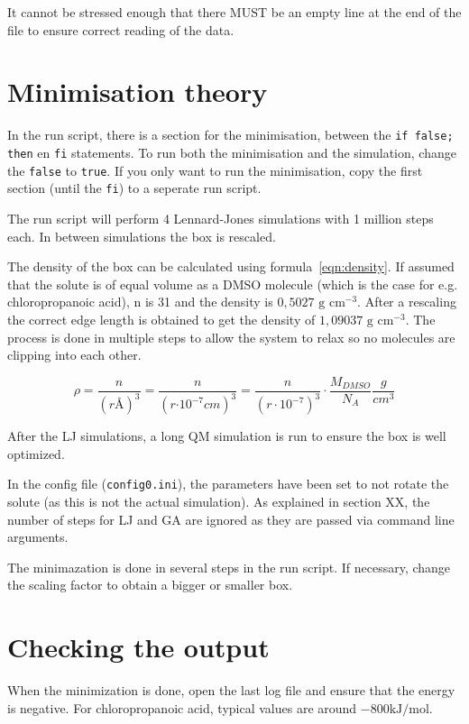 It cannot be stressed enough that there MUST be an empty line at the end of the 
file to ensure correct reading of the data.

\section{Minimisation theory}
In the run script, there is a section for the minimisation, between the 
\verb|if false; then| en \verb|fi| statements. To run both the minimisation and 
the simulation, change the \verb|false| to \verb|true|. If you only want to run 
the minimisation, copy the first section (until the \verb|fi|) to a seperate 
run script.

The run script will perform 4 Lennard-Jones simulations with 1 million steps 
each. In between simulations the box is rescaled.

The density of the box can be calculated using formula~\ref{eqn:density}. If 
assumed that the solute is of equal volume as a DMSO molecule (which is the 
case for e.g. chloropropanoic acid), n is 31 and the density is $0,5027 
\textrm{ g cm}^{-3}$. After a rescaling the correct edge length is obtained to 
get the density of $1,09037 \textrm{ g cm}^{-3}$.\cite{Radhamma2008}
The process is done in multiple steps to allow the system to relax so no 
molecules are clipping into each other.

\begin{equation} \label{eqn:density}
\rho = \dfrac{n}{(r \si{\angstrom})^3} = \dfrac{n}{(r \si{\cdot 10^{-7} cm})^3} 
=
\dfrac{n}{(r \cdot 10^{-7})^3} \cdot \dfrac{M_{DMSO}}{N_A} \dfrac{g}{cm^3}
\end{equation}

After the LJ simulations, a long QM simulation is run to ensure the box is well 
optimized.

In the config file (\verb|config0.ini|), the parameters have been set to not 
rotate the solute (as 
this is not the actual simulation). As explained in section XX, the number of 
steps for LJ and GA are ignored as they are passed via command line arguments.

The minimazation is done in several steps in the run script. If necessary, 
change the scaling factor to obtain a bigger or smaller box.


\section{Checking the output}
When the minimization is done, open the last log file and ensure that the 
energy is negative. For chloropropanoic acid, typical values are around $-800 
\textrm {kJ/mol}$.

